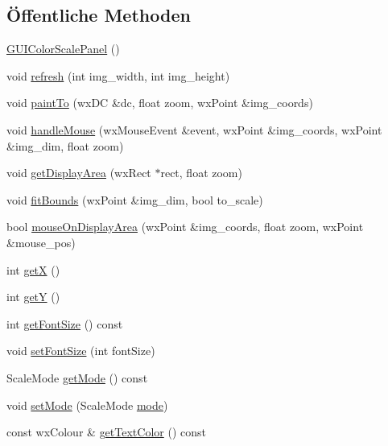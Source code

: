 \subsection*{Öffentliche Methoden}
\begin{DoxyCompactItemize}
\item 
\hyperlink{classGUIColorScalePanel_ad4ad453f831d149cc9fde46cba883431}{G\-U\-I\-Color\-Scale\-Panel} ()
\item 
void \hyperlink{classGUIColorScalePanel_a73f647d4f5eeb6b653777bb4c55696fa}{refresh} (int img\-\_\-width, int img\-\_\-height)
\item 
void \hyperlink{classGUIColorScalePanel_aaf6408cc09932a82afc7b2c233ec64c8}{paint\-To} (wx\-D\-C \&dc, float zoom, wx\-Point \&img\-\_\-coords)
\item 
void \hyperlink{classGUIColorScalePanel_a59e27a091ec86d4c3e649f432a10ec08}{handle\-Mouse} (wx\-Mouse\-Event \&event, wx\-Point \&img\-\_\-coords, wx\-Point \&img\-\_\-dim, float zoom)
\item 
void \hyperlink{classGUIColorScalePanel_aa7d5eb68ecd55e23b2e8969a21c32a22}{get\-Display\-Area} (wx\-Rect $\ast$rect, float zoom)
\item 
void \hyperlink{classGUIColorScalePanel_ac8faaae6f7016f0fecedfc350b65644b}{fit\-Bounds} (wx\-Point \&img\-\_\-dim, bool to\-\_\-scale)
\item 
bool \hyperlink{classGUIColorScalePanel_a4b17b0a63d3921ce09ffe5a99b6955a5}{mouse\-On\-Display\-Area} (wx\-Point \&img\-\_\-coords, float zoom, wx\-Point \&mouse\-\_\-pos)
\item 
int \hyperlink{classGUIColorScalePanel_a8f5da4bc81c7ef878214cd5d0a0b2c19}{get\-X} ()
\item 
int \hyperlink{classGUIColorScalePanel_a5eff7202dade14031b7bf45f305f54e4}{get\-Y} ()
\item 
int \hyperlink{classGUIColorScalePanel_a3569b14af591835eeb60b2aa9c672ca4}{get\-Font\-Size} () const 
\item 
void \hyperlink{classGUIColorScalePanel_ae26f3f500092717aa7e9a85126b38461}{set\-Font\-Size} (int font\-Size)
\item 
Scale\-Mode \hyperlink{classGUIColorScalePanel_a4af2d1c1f161f42e2d6573315caec82f}{get\-Mode} () const 
\item 
void \hyperlink{classGUIColorScalePanel_aba2363ced766a14d72ad5448502f62a4}{set\-Mode} (Scale\-Mode \hyperlink{classGUIColorScalePanel_ad2f795e0d3a1c8e731da16d3320dbd34}{mode})
\item 
const wx\-Colour \& \hyperlink{classGUIColorScalePanel_aae51a1ecdb5bfca126c36ad169fce846}{get\-Text\-Color} () const 

\end{DoxyCompactItemize}
